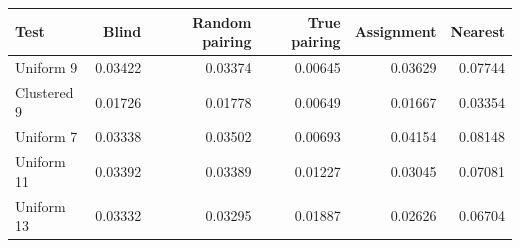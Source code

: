 \begin{tabular}{lrrrrr}
\toprule
Test & Blind & Random pairing & True pairing & Assignment & Nearest \\
\midrule
Uniform 9 & 0.03422 & 0.03374 & 0.00645 & 0.03629 & 0.07744 \\
Clustered 9 & 0.01726 & 0.01778 & 0.00649 & 0.01667 & 0.03354 \\
Uniform 7 & 0.03338 & 0.03502 & 0.00693 & 0.04154 & 0.08148 \\
Uniform 11 & 0.03392 & 0.03389 & 0.01227 & 0.03045 & 0.07081 \\
Uniform 13 & 0.03332 & 0.03295 & 0.01887 & 0.02626 & 0.06704 \\
\bottomrule
\end{tabular}
